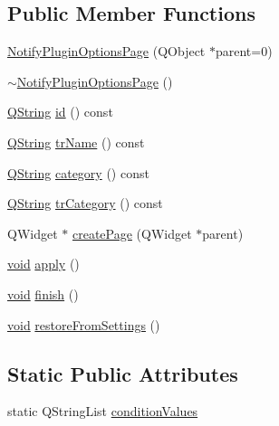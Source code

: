 \subsection*{\-Public \-Member \-Functions}
\begin{DoxyCompactItemize}
\item 
\hyperlink{group___notify_plugin_gaf584594e769010fbcdb1feb54b94eaab}{\-Notify\-Plugin\-Options\-Page} (\-Q\-Object $\ast$parent=0)
\item 
\hyperlink{group___notify_plugin_ga3dfd084ec6b7b9f55aeb3a5c475b11d7}{$\sim$\-Notify\-Plugin\-Options\-Page} ()
\item 
\hyperlink{group___u_a_v_objects_plugin_gab9d252f49c333c94a72f97ce3105a32d}{\-Q\-String} \hyperlink{group___notify_plugin_ga9528eeaab32e5a6696eb4e82c7dda847}{id} () const 
\item 
\hyperlink{group___u_a_v_objects_plugin_gab9d252f49c333c94a72f97ce3105a32d}{\-Q\-String} \hyperlink{group___notify_plugin_ga156b37b99e34d9b0e865f57efaa55f3c}{tr\-Name} () const 
\item 
\hyperlink{group___u_a_v_objects_plugin_gab9d252f49c333c94a72f97ce3105a32d}{\-Q\-String} \hyperlink{group___notify_plugin_ga1a0c17416e10df677d14565330619cfb}{category} () const 
\item 
\hyperlink{group___u_a_v_objects_plugin_gab9d252f49c333c94a72f97ce3105a32d}{\-Q\-String} \hyperlink{group___notify_plugin_ga963ad76e88d1a3737bd5d12e493c214a}{tr\-Category} () const 
\item 
\-Q\-Widget $\ast$ \hyperlink{group___notify_plugin_gaab5b02bf851c75f0476a29cc59bde9ae}{create\-Page} (\-Q\-Widget $\ast$parent)
\item 
\hyperlink{group___u_a_v_objects_plugin_ga444cf2ff3f0ecbe028adce838d373f5c}{void} \hyperlink{group___notify_plugin_gae0ac041ae8505afd88f981a6ac235fe7}{apply} ()
\item 
\hyperlink{group___u_a_v_objects_plugin_ga444cf2ff3f0ecbe028adce838d373f5c}{void} \hyperlink{group___notify_plugin_gaa13ff08a62eca11b672d5f7d88fa7c40}{finish} ()
\item 
\hyperlink{group___u_a_v_objects_plugin_ga444cf2ff3f0ecbe028adce838d373f5c}{void} \hyperlink{group___notify_plugin_ga2607c7c5d3db72401fe48f07838d36ce}{restore\-From\-Settings} ()
\end{DoxyCompactItemize}
\subsection*{\-Static \-Public \-Attributes}
\begin{DoxyCompactItemize}
\item 
static \-Q\-String\-List \hyperlink{group___notify_plugin_ga9823971d5ab6a1e6f68073d8553a7414}{condition\-Values}
\end{DoxyCompactItemize}


